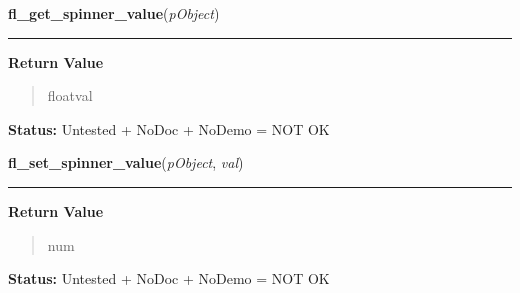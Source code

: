     \label{xformslib:library:fl_get_spinner_value}

    \vspace{0.5ex}

\hspace{.8\funcindent}\begin{boxedminipage}{\funcwidth}

    \raggedright \textbf{fl\_get\_spinner\_value}(\textit{pObject})

    \vspace{-1.5ex}

    \rule{\textwidth}{0.5\fboxrule}
\setlength{\parskip}{2ex}
\setlength{\parskip}{1ex}
      \textbf{Return Value}
    \vspace{-1ex}

      \begin{quote}
      floatval

      \end{quote}

\textbf{Status:} Untested + NoDoc + NoDemo = NOT OK



    \end{boxedminipage}

    \label{xformslib:library:fl_set_spinner_value}

    \vspace{0.5ex}

\hspace{.8\funcindent}\begin{boxedminipage}{\funcwidth}

    \raggedright \textbf{fl\_set\_spinner\_value}(\textit{pObject}, \textit{val})

    \vspace{-1.5ex}

    \rule{\textwidth}{0.5\fboxrule}
\setlength{\parskip}{2ex}
\setlength{\parskip}{1ex}
      \textbf{Return Value}
    \vspace{-1ex}

      \begin{quote}
      num

      \end{quote}

\textbf{Status:} Untested + NoDoc + NoDemo = NOT OK



    \end{boxedminipage}

